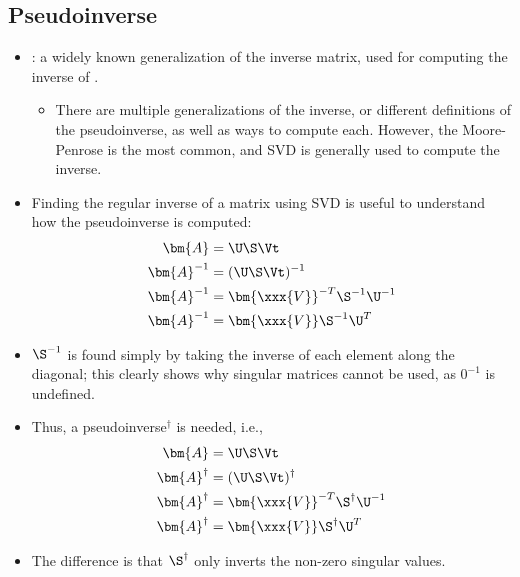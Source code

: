 \begin{itemize}
  \subsection{Pseudoinverse}\label{Pseudoinverse}
  \begin{itemize}
    \item {}: a widely known generalization of the inverse matrix, used for computing the inverse of \hyperref[Inverse Basics]{}.
      \begin{itemize}
        \item There are multiple generalizations of the inverse, or different definitions of the pseudoinverse, as well as ways to compute each. However, the Moore-Penrose is the most common, and SVD is generally used to compute the inverse.
      \end{itemize}
    \item Finding the regular inverse of a matrix using SVD is useful to understand how the pseudoinverse is computed:
    \begin{align*}
      \bm{A} &= \U\S\Vt \\
      \bm{A}^{-1} &= (\U\S\Vt)^{-1} \\
      \bm{A}^{-1} &= \bm{\xxx{V}}^{-T}\S^{-1}\U^{-1} \\
      \bm{A}^{-1} &= \bm{\xxx{V}}\S^{-1}\U^T
    \end{align*}
    \item \(\S ^{-1}\) is found simply by taking the inverse of each element along the diagonal; this clearly shows why singular matrices cannot be used, as \(0 ^{-1}\) is undefined.
    \item Thus, a pseudoinverse\(^\dagger\) is needed, i.e.,
    \begin{align*}
      \bm{A} &= \U\S\Vt \\
      \bm{A}^{\dagger} &= (\U\S\Vt)^{\dagger} \\
      \bm{A}^{\dagger} &= \bm{\xxx{V}}^{-T}\S^{\dagger}\U^{-1} \\
      \bm{A}^{\dagger} &= \bm{\xxx{V}}\S^{\dagger}\U^T
    \end{align*}
    \item The difference is that \(\S^\dagger\) only inverts the non-zero singular values.
  \end{itemize}


\end{itemize}
